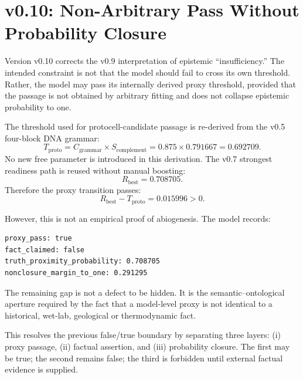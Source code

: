 \documentclass[11pt]{article}
\begin{document}


\section{v0.10: Non-Arbitrary Pass Without Probability Closure}

Version v0.10 corrects the v0.9 interpretation of epistemic ``insufficiency.'' The intended constraint is not that the model should fail to cross its own threshold. Rather, the model may pass its internally derived proxy threshold, provided that the passage is not obtained by arbitrary fitting and does not collapse epistemic probability to one.

The threshold used for protocell-candidate passage is re-derived from the v0.5 four-block DNA grammar:
\begin{equation}
T_{\mathrm{proto}} = C_{\mathrm{grammar}} \times S_{\mathrm{complement}}
= 0.875 \times 0.791667 = 0.692709.
\end{equation}
No new free parameter is introduced in this derivation. The v0.7 strongest readiness path is reused without manual boosting:
\begin{equation}
R_{\mathrm{best}} = 0.708705.
\end{equation}
Therefore the proxy transition passes:
\begin{equation}
R_{\mathrm{best}} - T_{\mathrm{proto}} = 0.015996 > 0.
\end{equation}

However, this is not an empirical proof of abiogenesis. The model records:
\begin{verbatim}
proxy_pass: true
fact_claimed: false
truth_proximity_probability: 0.708705
nonclosure_margin_to_one: 0.291295
\end{verbatim}
The remaining gap is not a defect to be hidden. It is the semantic--ontological aperture required by the fact that a model-level proxy is not identical to a historical, wet-lab, geological or thermodynamic fact.

This resolves the previous false/true boundary by separating three layers: (i) proxy passage, (ii) factual assertion, and (iii) probability closure. The first may be true; the second remains false; the third is forbidden until external factual evidence is supplied.


\end{document}
